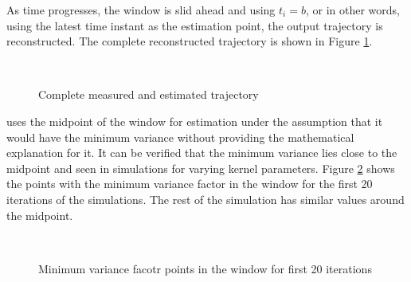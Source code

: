 \documentclass[letterpaper%
, twoside%
, 12pt%
,memoire%
, english%
,creativecommons,hyperref%
]{thETS}
\begin{document}
As time progresses, the window is slid ahead and using $t_i=b$, or in other words, using the latest time instant as the estimation point, the output trajectory is reconstructed. The complete reconstructed trajectory is shown in Figure \ref{Fig:recon}.\\
\begin{figure}
	\centering
	 \\ \parbox{0.75\textwidth}{\caption{Complete measured and estimated trajectory\label{Fig:recon}}}
\end{figure}
\citep{RN120} uses the midpoint of the window for estimation under the assumption that it would have the minimum variance without providing the mathematical explanation for it. It can be verified that the minimum variance lies close to the midpoint and seen in simulations for varying kernel parameters. Figure \ref{Fig:minVarPts} shows the points with the minimum variance factor in the window for the first 20 iterations of the simulations. The rest of the simulation has similar values around the midpoint. 

\begin{figure}
	\centering
	 \\ \parbox{0.75\textwidth}{\caption{Minimum variance facotr points in the window for first 20 iterations}\label{Fig:minVarPts}}
\end{figure}
\FloatBarrier
\end{document}
